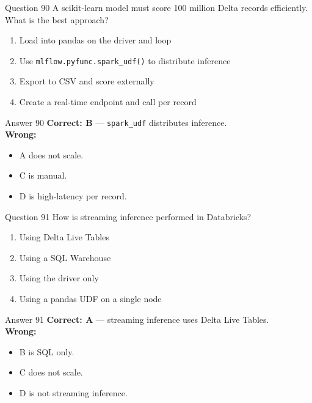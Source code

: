 \documentclass[aspectratio=169,11pt]{beamer}
\begin{document}
	\begin{frame}{Question 90}
		A scikit-learn model must score 100 million Delta records efficiently. What is the best approach?
		\begin{enumerate}[label=\Alph*.]
			\item Load into pandas on the driver and loop
			\item Use \texttt{mlflow.pyfunc.spark\_udf()} to distribute inference
			\item Export to CSV and score externally
			\item Create a real-time endpoint and call per record
		\end{enumerate}
	\end{frame}
	\begin{frame}{Answer 90}
		\textbf{Correct: B} --- \texttt{spark\_udf} distributes inference.\\
		\vspace{0.5em}
		\textbf{Wrong:}
		\begin{itemize}
			\item A does not scale.
			\item C is manual.
			\item D is high-latency per record.
		\end{itemize}
	\end{frame}
	
	\begin{frame}{Question 91}
		How is streaming inference performed in Databricks?
		\begin{enumerate}[label=\Alph*.]
			\item Using Delta Live Tables
			\item Using a SQL Warehouse
			\item Using the driver only
			\item Using a pandas UDF on a single node
		\end{enumerate}
	\end{frame}
	\begin{frame}{Answer 91}
		\textbf{Correct: A} --- streaming inference uses Delta Live Tables.\\
		\vspace{0.5em}
		\textbf{Wrong:}
		\begin{itemize}
			\item B is SQL only.
			\item C does not scale.
			\item D is not streaming inference.
		\end{itemize}
	\end{frame}
	
\end{document}
